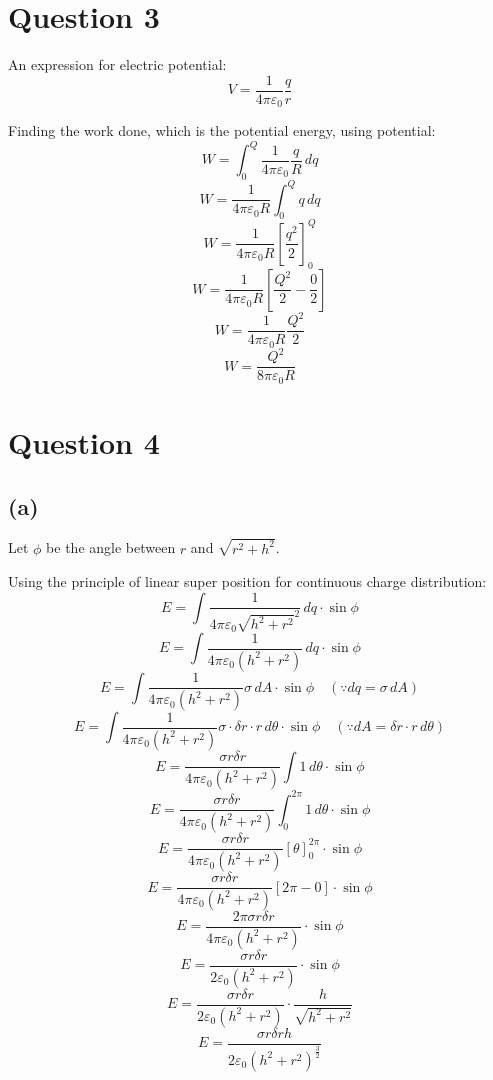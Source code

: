\documentclass[11pt]{article}
\begin{document}
\newpage
\section{Question 3}
\label{sec:orgcbf85d8}
An expression for electric potential:
\[V = \frac{1}{4 \pi \varepsilon_0} \frac{q}{r}\]

Finding the work done, which is the potential energy, using potential:
\[W = \int_0^Q \frac{1}{4 \pi \varepsilon_0} \frac{q}{R} \, dq\]
\[W = \frac{1}{4 \pi \varepsilon_0 R} \int_0^Q q \, dq\]
\[W = \frac{1}{4 \pi \varepsilon_0 R} \left[\frac{q^2}{2} \right]_0^Q\]
\[W = \frac{1}{4 \pi \varepsilon_0 R} \left[\frac{Q^2}{2} - \frac{0}{2} \right]\]
\[W = \frac{1}{4 \pi \varepsilon_0 R} \frac{Q^2}{2}\]
\[W = \frac{Q^2}{8 \pi \varepsilon_0 R}\]

\newpage
\section{Question 4}
\label{sec:org87ef968}

\subsection{(a)}
\label{sec:org0a1dfbc}
Let \(\phi\) be the angle between \(r\) and \(\sqrt{r^2 + h^2}\).


Using the principle of linear super position for continuous charge distribution:
\[E = \int \frac{1}{4 \pi \varepsilon_0 \sqrt{h^2 + r^2}^2} \, dq \cdot \sin \phi\]
\[E = \int \frac{1}{4 \pi \varepsilon_0 (h^2 + r^2)} \, dq \cdot \sin \phi\]
\[E = \int \frac{1}{4 \pi \varepsilon_0 (h^2 + r^2)} \sigma \, dA \cdot \sin \phi \quad (\because dq = \sigma \, dA)\]
\[E = \int \frac{1}{4 \pi \varepsilon_0 (h^2 + r^2)} \sigma \cdot \delta r \cdot r \, d \theta \cdot \sin \phi \quad (\because dA = \delta r \cdot r \, d \theta)\]
\[E = \frac{\sigma r \delta r}{4 \pi \varepsilon_0 (h^2 + r^2)} \int 1 \, d \theta \cdot \sin \phi\]
\[E = \frac{\sigma r \delta r}{4 \pi \varepsilon_0 (h^2 + r^2)} \int_0^{2\pi} 1 \, d \theta \cdot \sin \phi\]
\[E = \frac{\sigma r \delta r}{4 \pi \varepsilon_0 (h^2 + r^2)} [\theta]_0^{2\pi} \cdot \sin \phi\]
\[E = \frac{\sigma r \delta r}{4 \pi \varepsilon_0 (h^2 + r^2)} [2 \pi - 0] \cdot \sin \phi\]
\[E = \frac{2 \pi \sigma r \delta r}{4 \pi \varepsilon_0 (h^2 + r^2)} \cdot \sin \phi\]
\[E = \frac{\sigma r \delta r}{2 \varepsilon_0 (h^2 + r^2)} \cdot \sin \phi\]
\[E = \frac{\sigma r \delta r}{2 \varepsilon_0 (h^2 + r^2)} \cdot \frac{h}{\sqrt{h^2 + r^2}}\]
\[E = \frac{\sigma r \delta r h}{2 \varepsilon_0 (h^2 + r^2)^{\frac{3}{2}}}\]
\end{document}
